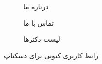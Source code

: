 \documentclass[a4paper,12pt]{report}
\begin{document}
\begin{figure}[!h]
		\begin{subfigure}[t]{0.47\linewidth}
			\caption{
				درباره ‌ما}
		\end{subfigure}\hfill%
		\begin{subfigure}[t]{0.47\linewidth}
			\caption{
				تماس با ما}
		\end{subfigure}
	
		\begin{subfigure}[t]{0.75\linewidth}
			\caption{
				لیست دکتر‌ها}
		\end{subfigure}
		\normalsize
		\label{fig1:sec3:chap3}
		\caption{
			رابط کاربری کنونی برای دسکتاپ
		}
	\end{figure}
\end{document}
